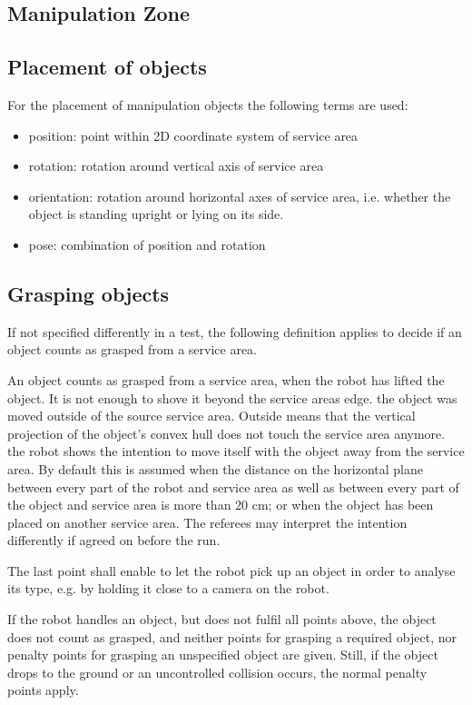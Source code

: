 \subsection{Manipulation Zone}

\subsection{Placement of objects}
For the placement of manipulation objects the following terms are used:

\begin{itemize}
\item position: point within 2D coordinate system of service area
\item rotation: rotation around vertical axis of service area
\item orientation: rotation around horizontal axes of service area, i.e. whether the object is standing upright or lying on its side.
\item pose: combination of position and rotation
\end{itemize}

\subsection{Grasping objects}
If not specified differently in a test, the following definition applies to decide if an object counts as grasped from a service area. 
\par
An object counts as grasped from a service area, when
the robot has lifted the object. It is not enough to shove it beyond the service areas edge.
the object was moved outside of the source service area. Outside means that the vertical projection of the object’s convex hull does not touch the service area anymore.
the robot shows the intention to move itself with the object away from the service area. By default this is assumed when the distance on the horizontal plane between every part of the robot and service area as well as between every part of the object and service area is more than 20 cm; or when the object has been placed on another service area. The referees may interpret the intention differently if agreed on before the run.
\par
The last point shall enable to let the robot pick up an object in order to analyse its type, e.g. by holding it close to a camera on the robot. 
\par
If the robot handles an object, but does not fulfil all points above, the object does not count as grasped, and neither points for grasping a required object, nor penalty points for grasping an unspecified object are given. Still, if the object drops to the ground or an uncontrolled collision occurs, the normal penalty points apply.

